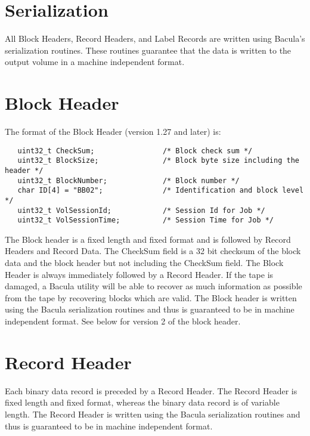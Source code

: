 \section{Serialization}

All Block Headers, Record Headers, and Label Records are written using
Bacula's serialization routines. These routines guarantee that the data is
written to the output volume in a machine independent format. 

\section{Block Header}

The format of the Block Header (version 1.27 and later) is: 

\footnotesize
\begin{verbatim}
   uint32_t CheckSum;                /* Block check sum */
   uint32_t BlockSize;               /* Block byte size including the header */
   uint32_t BlockNumber;             /* Block number */
   char ID[4] = "BB02";              /* Identification and block level */
   uint32_t VolSessionId;            /* Session Id for Job */
   uint32_t VolSessionTime;          /* Session Time for Job */
\end{verbatim}
\normalsize

The Block header is a fixed length and fixed format and is followed by Record
Headers and Record Data. The CheckSum field is a 32 bit checksum of the block
data and the block header but not including the CheckSum field. The Block
Header is always immediately followed by a Record Header. If the tape is
damaged, a Bacula utility will be able to recover as much information as
possible from the tape by recovering blocks which are valid. The Block header
is written using the Bacula serialization routines and thus is guaranteed to
be in machine independent format. See below for version 2 of the block header.


\section{Record Header}

Each binary data record is preceded by a Record Header. The Record Header is
fixed length and fixed format, whereas the binary data record is of variable
length. The Record Header is written using the Bacula serialization routines
and thus is guaranteed to be in machine independent format. 

